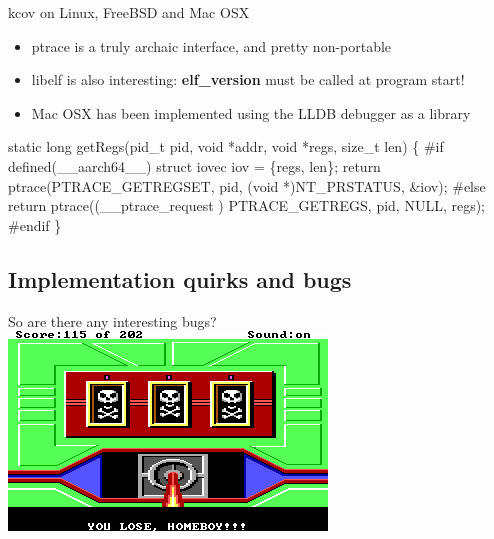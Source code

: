 \documentclass{beamer}
\begin{document}
\begin{frame}[fragile]{kcov on Linux, FreeBSD and Mac OSX}
{%
  }
    \begin{itemize}
    \item ptrace is a truly archaic interface, and pretty non-portable
    \item libelf is also interesting: \textbf{elf\_version} must be called at program start!
    \item Mac OSX has been implemented using the LLDB debugger as a library
    \end{itemize}
  \begin{Example}
    \begin{semiverbatim}
      \scriptsize
static long getRegs(pid\_t pid, void *addr, void *regs, size\_t len)
\{
#if defined(\_\_aarch64\_\_)
    struct iovec iov = \{regs, len\};
    return ptrace(PTRACE\_GETREGSET, pid, (void *)NT\_PRSTATUS, &iov);
#else
    return ptrace((\__ptrace\_request ) PTRACE\_GETREGS, pid, NULL, regs);
#endif
\}
    \end{semiverbatim}
  \end{Example}
\end{frame}

\subsection{Implementation quirks and bugs}
\begin{frame}{So are there any interesting bugs?}
  \includegraphics[width=\linewidth]{sq_slotmachine}
\end{frame}
\end{document}

